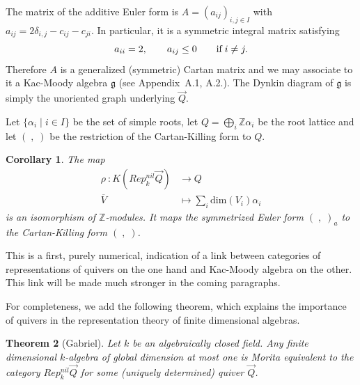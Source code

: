 \documentclass[a4paper,10pt]{amsart}
\def\Z{\mathbb{Z}}
\def\a{\alpha}
\def\g{\mathfrak{g}}
\newtheorem{theo}{\bf{Theorem}}[section]
\newtheorem{cor}[theo]{Corollary}
\numberwithin{equation}{section}
\begin{document}
\vspace{.15in}

The matrix of the additive Euler form is $A=(a_{ij})_{i,j \in I}$ with $a_{ij}=2\delta_{i,j} -c_{ij}-c_{ji}$.
In particular, it is a symmetric integral matrix satisfying
$$a_{ii}=2, \qquad a_{ij} \leq 0 \qquad \text{if\;} i \neq j.$$
Therefore $A$ is a generalized (symmetric) Cartan matrix and we may associate to it a Kac-Moody algebra $\g$ (see Appendix~A.1, A.2.). The Dynkin diagram of $\g$ is simply the unoriented graph underlying $\vec{Q}$.

Let $\{\a_i\;|\; i \in I\}$ be the set of simple roots, let $Q=\bigoplus_i \Z \a_i$ be the root lattice and let $(\;,\;)$ be the restriction of the Cartan-Killing form to $Q$.

\vspace{.15in}

\begin{cor}\label{C:KrepQ} The map
\begin{align*}
\rho~: K(Rep^{nil}_k\vec{Q}) &\to Q\\
\overline{V} &\mapsto  \sum_i \text{dim}(V_i) \a_i
\end{align*}
is an isomorphism of $\Z$-modules. It maps the symmetrized Euler form $(\;,\;)_a$ to the Cartan-Killing form $(\;,\;)$.
\end{cor}

\vspace{.1in}

This is a first, purely numerical, indication of a link between categories of representations of quivers on the one hand and Kac-Moody algebra on the other. This link will be made much stronger in the coming paragraphs.

\vspace{.15in}

For completeness, we add the following theorem, which explains the importance of quivers in the representation theory of finite dimensional algebras.

\vspace{.1in}

\begin{theo}[Gabriel]\label{T:Gabriel} Let $k$ be an algebraically closed field. Any finite dimensional $k$-algebra of global dimension at most one is Morita equivalent to the category $Rep^{nil}_k\vec{Q}$ for some (uniquely determined) quiver $\vec{Q}$.\end{theo}

\vspace{.1in}
\end{document}
